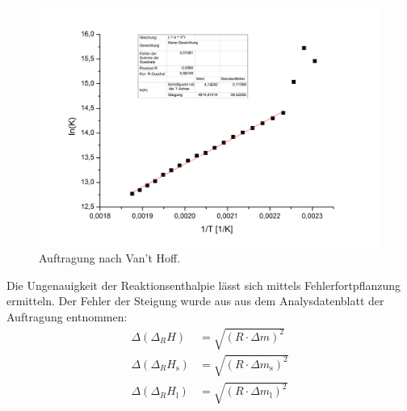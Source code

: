 \documentclass[12pt,a4paper,titlepage,headinclude,bibtotoc]{scrartcl}
\begin{document}
\FloatBarrier
\begin{figure}[h]
\includegraphics[width=13.5cm]{Van't_HoffNeu.png}
\caption{Auftragung nach Van't Hoff.}
\end{figure} 
\FloatBarrier
Die Ungenauigkeit der Reaktionsenthalpie lässt sich mittels Fehlerfortpflanzung ermitteln. Der Fehler der Steigung wurde aus aus dem Analysdatenblatt der Auftragung entnommen:
\begin{align}
\Delta(\Delta_R H) &= \sqrt{(R\cdot\Delta m)^2}\\
\Delta(\Delta_R H_{\text{s}}) &= \sqrt{(R\cdot\Delta m_{\text{s}})^2}\\
\Delta(\Delta_R H_{\text{l}}) &= \sqrt{(R\cdot\Delta m_{\text{l}})^2}
\end{align}
\end{document}
